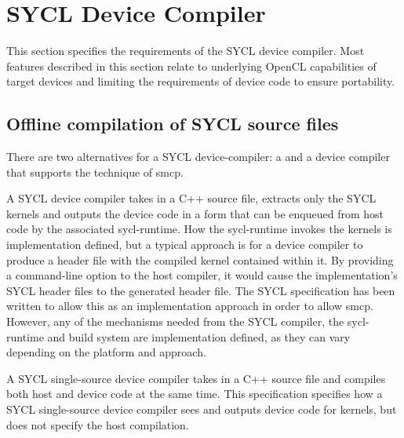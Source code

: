 
\chapter{SYCL Device Compiler}
\label{chapter.device.compiler}

This section specifies the requirements of the SYCL device compiler.
Most features described in this section relate to underlying OpenCL
capabilities of target devices and limiting the requirements of device
code to ensure portability.

\section{Offline compilation of SYCL source files}

There are two alternatives for a SYCL \gls{device-compiler}: a 
 and a device compiler that supports
the technique of \gls{smcp}.

A SYCL device compiler takes in a C++ source file, extracts only
the SYCL kernels and outputs the device code in a form that can be enqueued
from host code by the associated \gls{sycl-runtime}. How the \gls{sycl-runtime} invokes the
kernels is implementation defined, but a typical approach is for a device
compiler to produce a header file with the compiled kernel contained within it.
By providing a command-line option to the host compiler, it would cause the
implementation's SYCL header files to  the generated header file.
The SYCL specification has been written to allow this as an implementation
approach in order to allow \gls{smcp}. However, any of the
mechanisms needed from the SYCL compiler, the \gls{sycl-runtime} and build system are
implementation defined, as they can vary depending on the platform and approach.

A SYCL single-source device compiler takes in a C++ source file and compiles
both host and device code at the same time. This specification specifies how
a SYCL single-source device compiler sees and outputs device code for kernels,
but does not specify the host compilation.

